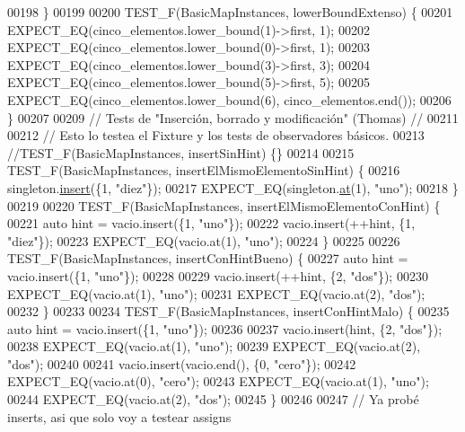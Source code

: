 \begin{DoxyCode}
00198 \}
00199 
00200 TEST\_F(BasicMapInstances, lowerBoundExtenso) \{
00201     EXPECT\_EQ(cinco\_elementos.lower\_bound(1)->first, 1);
00202     EXPECT\_EQ(cinco\_elementos.lower\_bound(0)->first, 1);
00203     EXPECT\_EQ(cinco\_elementos.lower\_bound(3)->first, 3);
00204     EXPECT\_EQ(cinco\_elementos.lower\_bound(5)->first, 5);
00205     EXPECT\_EQ(cinco\_elementos.lower\_bound(6), cinco\_elementos.end());
00206 \}
00207 
00209 \textcolor{comment}{// Tests de "Inserción, borrado y modificación" (Thomas) //}
00211 \textcolor{comment}{}
00212 \textcolor{comment}{// Esto lo testea el Fixture y los tests de observadores básicos.}
00213 \textcolor{comment}{//TEST\_F(BasicMapInstances, insertSinHint) \{\}}
00214 
00215 TEST\_F(BasicMapInstances, insertElMismoElementoSinHint) \{
00216     singleton.\hyperlink{classaed2_1_1map_a60aacba06b1579630b3c8e996cf248c8_a60aacba06b1579630b3c8e996cf248c8}{insert}(\{1, \textcolor{stringliteral}{"diez"}\});
00217     EXPECT\_EQ(singleton.\hyperlink{classaed2_1_1map_a579c9179b42175c23a1013ac7f1b876c_a579c9179b42175c23a1013ac7f1b876c}{at}(1), \textcolor{stringliteral}{"uno"});
00218 \}
00219 
00220 TEST\_F(BasicMapInstances, insertElMismoElementoConHint) \{
00221     \textcolor{keyword}{auto} hint = vacio.insert(\{1, \textcolor{stringliteral}{"uno"}\});
00222     vacio.insert(++hint, \{1, \textcolor{stringliteral}{"diez"}\});
00223     EXPECT\_EQ(vacio.at(1), \textcolor{stringliteral}{"uno"});
00224 \}
00225 
00226 TEST\_F(BasicMapInstances, insertConHintBueno) \{
00227     \textcolor{keyword}{auto} hint = vacio.insert(\{1, \textcolor{stringliteral}{"uno"}\});
00228 
00229     vacio.insert(++hint, \{2, \textcolor{stringliteral}{"dos"}\});
00230     EXPECT\_EQ(vacio.at(1), \textcolor{stringliteral}{"uno"});
00231     EXPECT\_EQ(vacio.at(2), \textcolor{stringliteral}{"dos"});
00232 \}
00233 
00234 TEST\_F(BasicMapInstances, insertConHintMalo) \{
00235     \textcolor{keyword}{auto} hint = vacio.insert(\{1, \textcolor{stringliteral}{"uno"}\});
00236 
00237     vacio.insert(hint, \{2, \textcolor{stringliteral}{"dos"}\});
00238     EXPECT\_EQ(vacio.at(1), \textcolor{stringliteral}{"uno"});
00239     EXPECT\_EQ(vacio.at(2), \textcolor{stringliteral}{"dos"});
00240 
00241     vacio.insert(vacio.end(), \{0, \textcolor{stringliteral}{"cero"}\});
00242     EXPECT\_EQ(vacio.at(0), \textcolor{stringliteral}{"cero"});
00243     EXPECT\_EQ(vacio.at(1), \textcolor{stringliteral}{"uno"});
00244     EXPECT\_EQ(vacio.at(2), \textcolor{stringliteral}{"dos"});
00245 \}
00246 
00247 \textcolor{comment}{// Ya probé inserts, asi que solo voy a testear assigns}

\end{DoxyCode}
